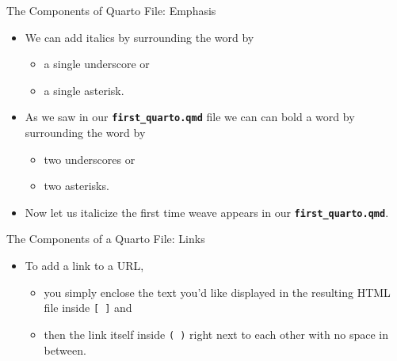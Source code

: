 \documentclass[
  ignorenonframetext,
]{beamer}
\providecommand{\tightlist}{%
  \setlength{\itemsep}{0pt}\setlength{\parskip}{0pt}}
\begin{document}
\begin{frame}[fragile]{The Components of Quarto File: Emphasis}
\label{the-components-of-quarto-file-emphasis}
\begin{itemize}
\item
  We can add italics by surrounding the word by

  \begin{itemize}
  \tightlist
  \item
    a single underscore or
  \item
    a single asterisk.
  \end{itemize}
\item
  As we saw in our \textbf{\texttt{first\_quarto.qmd}} file we can can
  bold a word by surrounding the word by

  \begin{itemize}
  \tightlist
  \item
    two underscores or
  \item
    two asterisks.
  \end{itemize}
\item
  Now let us italicize the first time weave appears in our
  \textbf{\texttt{first\_quarto.qmd}}.
\end{itemize}
\end{frame}

\begin{frame}[fragile]{The Components of a Quarto File: Links}
\label{the-components-of-a-quarto-file-links}
\begin{itemize}
\item
  To add a link to a URL,

  \begin{itemize}
  \tightlist
  \item
    you simply enclose the text you'd like displayed in the resulting
    HTML file inside \texttt{{[}\ {]}} and
  \item
    then the link itself inside \texttt{(\ )} right next to each other
    with no space in between.
  \end{itemize}
\end{itemize}
\end{frame}
\end{document}
